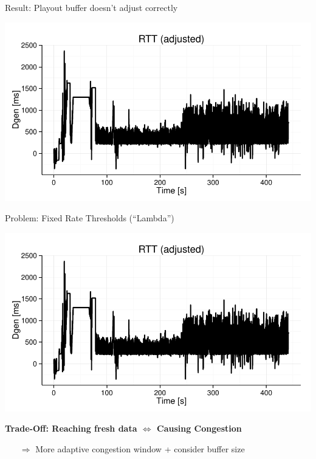 \begin{frame}{Result: Playout buffer doesn't adjust correctly}
	
	\includegraphics[width=\linewidth,page=6]{images/test8_1.pdf}
	
\end{frame}


\begin{frame}{Problem: Fixed Rate Thresholds (``Lambda'')}
	
	\includegraphics[width=\linewidth,page=7]{images/test8_1.pdf}
	
	\textbf{Trade-Off: Reaching fresh data $\Leftrightarrow$ Causing Congestion}
	\begin{itemize}
	\item[$\Rightarrow$] More adaptive congestion window + consider buffer size
	\end{itemize} 
\end{frame}


